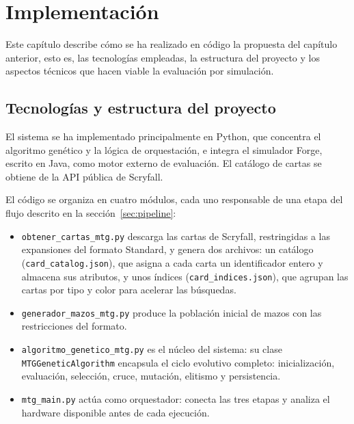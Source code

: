 
\chapter{Implementación}
\label{cap:implementacion}

Este capítulo describe cómo se ha realizado en código la propuesta del capítulo anterior, esto es, las tecnologías empleadas, la estructura del proyecto y los aspectos técnicos que hacen viable la evaluación por simulación.

\section{Tecnologías y estructura del proyecto}

El sistema se ha implementado principalmente en Python, que concentra el algoritmo genético y la lógica de orquestación, e integra el simulador Forge, escrito en Java, como motor externo de evaluación. El catálogo de cartas se obtiene de la API pública de Scryfall.

El código se organiza en cuatro módulos, cada uno responsable de una etapa del flujo descrito en la sección~\ref{sec:pipeline}:

\begin{itemize}
    \item \texttt{obtener\_cartas\_mtg.py} descarga las cartas de Scryfall, restringidas a las expansiones del formato Standard, y genera dos archivos: un catálogo (\texttt{card\_catalog.json}), que asigna a cada carta un identificador entero y almacena sus atributos, y unos índices (\texttt{card\_indices.json}), que agrupan las cartas por tipo y color para acelerar las búsquedas.
    \item \texttt{generador\_mazos\_mtg.py} produce la población inicial de mazos con las restricciones del formato.
    \item \texttt{algoritmo\_genetico\_mtg.py} es el núcleo del sistema: su clase \texttt{MTG\allowbreak Genetic\allowbreak Algorithm} encapsula el ciclo evolutivo completo: inicialización, evaluación, selección, cruce, mutación, elitismo y persistencia.
    \item \texttt{mtg\_main.py} actúa como orquestador: conecta las tres etapas y analiza el hardware disponible antes de cada ejecución.
\end{itemize}

